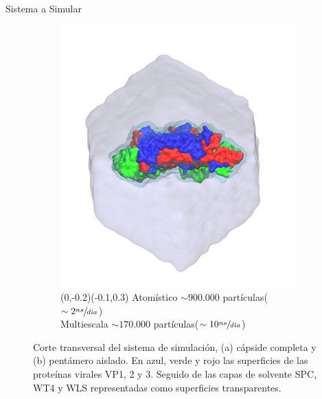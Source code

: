 \documentclass[8pt]{beamer}
\begin{document}
\begin{frame}[t]{Sistema a Simular}
\begin{figure}[ht]
\begin{subfigure}[t]{.48\textwidth}
  \includegraphics[width=1\textwidth]{Figure/TrV_Pentamer_WaterBox.png}
  \vspace{-1cm}
  \caption*{
  (0,-0.2)(-0.1,0.3)
  \footnotesize{Atomístico $\sim900.000$ partículas($\sim2\sfrac{ns}{d\acute{\imath}a}$) \\ Multiescala $\sim170.000$ partículas($\sim10\sfrac{ns}{d\acute{\imath}a}$)}
  }
  \label{fig:trv_pentamer_waterbox}
\end{subfigure}
\hspace*{\fill}
\caption*{ Corte transversal del sistema de simulación, (a) cápside completa y (b) pentámero aislado. En azul, verde y rojo las superficies de las proteínas virales VP1, 2 y 3. Seguido de las capas de solvente SPC, WT4 y WLS representadas como superficies transparentes.}%
\end{figure}
\end{frame}
\end{document}
